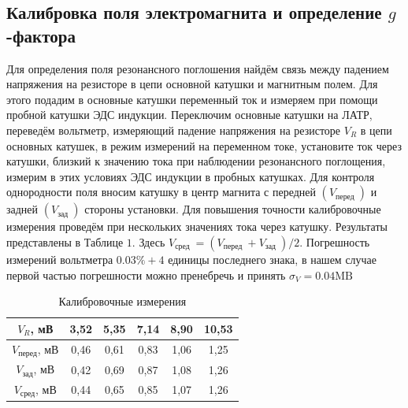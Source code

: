 \documentclass[a4paper, 12pt]{article}%
\begin{document}
\subsection*{Калибровка поля электромагнита и определение $g$-фактора}
Для определения поля резонансного поглошения найдём связь между падением напряжения на резисторе в цепи основной катушки и магнитным полем. Для этого подадим в основные катушки переменный ток и измеряем при помощи пробной катушки ЭДС индукции. Переключим основные катушки на ЛАТР, переведём вольтметр, измеряющий падение напряжения на резисторе $V_{R}$ в цепи основных катушек, в режим измерений на переменном токе, установите ток через катушки, близкий к значению тока при наблюдении резонансного поглощения, измерим в этих условиях ЭДС индукции в пробных катушках. Для контроля однородности поля вносим катушку в центр магнита с передней $\left(V_{\text {перед }}\right)$ и задней $\left(V_{\text {зад }}\right)$ стороны установки. Для повышения точности калибровочные измерения проведём при нескольких значениях тока через катушку. Результаты представлены в Таблице $1 .$ Здесь $V_{\text {сред }}=\left(V_{\text {перед }}+V_{\text {зад }}\right) / 2 .$ Погрешность измерений вольтметра $0.03 \%+4$ единицы последнего знака, в нашем случае первой частью погрешности можно пренебречь и принять $\sigma_{V}=0.04 \mathrm{MB}$

\begin{table}[h]
\begin{center}
\begin{tabular}{|c|c|c|c|c|c|}
\hline
$V_R$, мВ              & 3,52 & 5,35 & 7,14 & 8,90 & 10,53 \\ \hline
$V_{\text{перед}}$, мВ & 0,46 & 0,61 & 0,83 & 1,06 & 1,25  \\ \hline
$V_{\text{зад}}$, мВ   & 0,42 & 0,69 & 0,87 & 1,08 & 1,26  \\ \hline
$V_{\text{сред}}$, мВ  & 0,44 & 0,65 & 0,85 & 1,07 & 1,26  \\ \hline
\end{tabular}
\caption{Калибровочные измерения}
\end{center}
\end{table}
\end{document}
